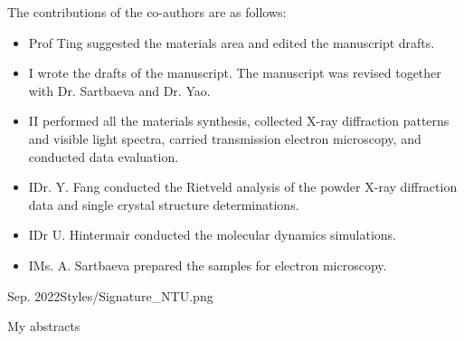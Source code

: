 \documentclass[12pt,a4paper]{Thesis} %
\begin{document}
{	The contributions of the co-authors are as follows:
	\begin{itemize}[topsep=1pt,itemsep=1pt,partopsep=1pt, parsep=1pt]
		\item Prof Ting suggested the materials area and edited the manuscript drafts.
		\item I wrote the drafts of the manuscript.  The manuscript was revised together with Dr. Sartbaeva and Dr. Yao.
		\item II performed all the materials synthesis, collected X-ray diffraction patterns and visible light spectra, carried transmission electron microscopy, and conducted data evaluation.
		\item IDr. Y. Fang conducted the Rietveld analysis of the powder X-ray diffraction data and single crystal structure determinations.
		\item IDr U. Hintermair conducted the molecular dynamics simulations.
		\item IMs. A. Sartbaeva prepared the samples for electron microscopy.
	\end{itemize}
 
}{Sep. 2022}{Styles/Signature_NTU.png}







My abstracts

\cleardoublepage



\end{document}
